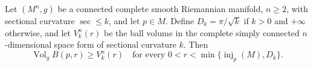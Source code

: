 Let \((M^n,g)\) be a connected complete smooth Riemannian manifold, \(n\ge2\), with sectional curvature \(\sec\le k\), and let \(p\in M\). Define \(D_k=\pi/\sqrt{k}\) if \(k>0\) and \(+\infty\) otherwise, and let \(V_k^n(r)\) be the ball volume in the complete simply connected \(n\)-dimensional space form of sectional curvature \(k\). Then
\[
\operatorname{Vol}_g B(p,r)\ge V_k^n(r)
\quad\text{for every }0<r<\min\{\operatorname{inj}_p(M),D_k\}.
\]
